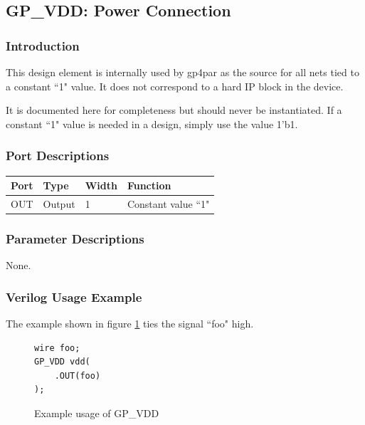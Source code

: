 \documentclass{article}
\begin{document}

\FloatBarrier
\pagebreak
\subsection{GP\_VDD: Power Connection}

\subsubsection{Introduction}
This design element is internally used by gp4par as the source for all nets tied to a constant ``1" value. It does not 
correspond to a hard IP block in the device.

It is documented here for completeness but should never be instantiated. If a constant ``1" value is needed in a 
design, simply use the value 1'b1.

\subsubsection{Port Descriptions}

\begin{tabularx}{4in}{|l|l|l|X|}
\hline
{\bfseries Port} & {\bfseries Type} & {\bfseries Width} & {\bfseries Function} \\
\hline
OUT & Output & 1 & Constant value ``1" \\
\hline
\end{tabularx}

\subsubsection{Parameter Descriptions}

None.

\subsubsection{Verilog Usage Example}

The example shown in figure \ref{gp-vdd-example} ties the signal ``foo" high.

\begin{figure}[h]
\begin{lstlisting}
wire foo;
GP_VDD vdd(
	.OUT(foo)
);
\end{lstlisting}
\caption{Example usage of GP\_VDD}
\label{gp-vdd-example}
\end{figure}
\end{document}
